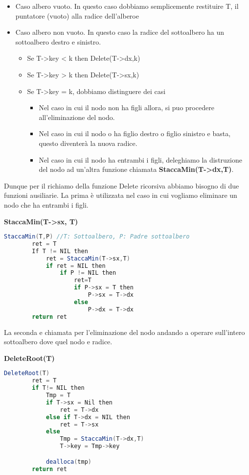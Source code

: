 \begin{itemize}
	\item Caso albero vuoto. In questo caso dobbiamo semplicemente restituire T, il puntatore (vuoto) alla radice dell'alberoe
	\item Caso albero non vuoto. In questo caso la radice del sottoalbero ha un sottoalbero destro e sinistro.
		\begin{itemize}
			\item Se T->key < k then Delete(T->dx,k)
			\item Se T->key > k then Delete(T->sx,k)
			\item Se T->key = k, dobbiamo distinguere dei casi
			\begin{itemize}
				\item Nel caso in cui il nodo non ha figli allora, si puo procedere all'eliminazione del nodo.
				\item Nel caso in cui il nodo o ha figlio destro o figlio sinistro e basta, questo diventerà la nuova radice. 
				\item Nel caso in cui il nodo ha entrambi i figli, deleghiamo la distruzione del nodo ad un'altra funzione chiamata \textbf{StaccaMin(T->dx,T)}.
			\end{itemize}
		\end{itemize}
\end{itemize}

Dunque per il richiamo della funzione Delete ricorsiva abbiamo bisogno di due funzioni ausiliarie. La prima è utilizzata nel caso in cui vogliamo eliminare un nodo che ha entrambi i figli.

\textbf{StaccaMin(T->sx, T)}

\begin{lstlisting}[language=Java]
	StaccaMin(T,P) //T: Sottoalbero, P: Padre sottoalbero
		ret = T
		If T != NIL then
			ret = StaccaMin(T->sx,T)
			if ret = NIL then
				if P != NIL then
					ret=T
					if P->sx = T then
						P->sx = T->dx
					else
						P->dx = T->dx
		return ret
\end{lstlisting}

La seconda e chiamata per l'eliminazione del nodo andando a operare sull'intero sottoalbero dove quel nodo e radice.
\newpage

\textbf{DeleteRoot(T)}

\begin{lstlisting}[language=Java]
	DeleteRoot(T)
		ret = T
		if T!= NIL then
			Tmp = T
			if T->sx = Nil then
				ret = T->dx
			else if T->dx = NIL then
				ret = T->sx
			else
				Tmp = StaccaMin(T->dx,T)
				T->key = Tmp->key

			dealloca(tmp)
		return ret
\end{lstlisting}

